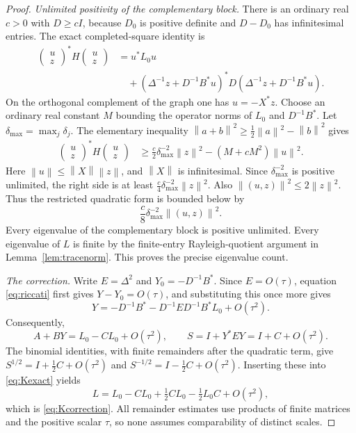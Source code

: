 \documentclass[11pt,oneside]{article}
\numberwithin{equation}{section}
\theoremstyle{plain}
\theoremstyle{definition}
\theoremstyle{remark}
\newcommand{\norm}[1]{\left\|#1\right\|}
\begin{document}
\begin{proof}
\textit{Unlimited positivity of the complementary block.}
There is an ordinary real $c>0$ with $D\ge cI$, because $D_0$ is positive definite and $D-D_0$ has infinitesimal entries. The exact completed-square identity is
\begin{align}\label{eq:completesquare}
 \begin{pmatrix}u\\z\end{pmatrix}^{\!*}
 H\begin{pmatrix}u\\z\end{pmatrix}
 &=u^*L_0u\\
 &\quad+(\Delta^{-1}z+D^{-1}B^*u)^*
 D(\Delta^{-1}z+D^{-1}B^*u).\nonumber
\end{align}
On the orthogonal complement of the graph one has $u=-X^*z$. Choose an ordinary real constant $M$ bounding the operator norms of $L_0$ and $D^{-1}B^*$. Let $\delta_{\max}=\max_j\delta_j$. The elementary inequality
$\norm{a+b}^2\ge\tfrac12\norm a^2-\norm b^2$ gives
\begin{align*}
 \begin{pmatrix}u\\z\end{pmatrix}^{\!*}
 H\begin{pmatrix}u\\z\end{pmatrix}
 &\ge \frac c2\delta_{\max}^{-2}\norm z^2
 -(M+cM^2)\norm u^2.
\end{align*}
Here $\norm u\le\norm X\norm z$, and $\norm X$ is infinitesimal. Since $\delta_{\max}^{-2}$ is positive unlimited, the right side is at least
$\tfrac c4\delta_{\max}^{-2}\norm z^2$. Also
$\norm{(u,z)}^2\le2\norm z^2$. Thus the restricted quadratic form is bounded below by
\[
 \frac c8\delta_{\max}^{-2}\norm{(u,z)}^2.
\]
Every eigenvalue of the complementary block is positive unlimited. Every eigenvalue of $L$ is finite by the finite-entry Rayleigh-quotient argument in Lemma~\ref{lem:tracenorm}. This proves the precise eigenvalue count.

\textit{The correction.}
Write $E=\Delta^2$ and $Y_0=-D^{-1}B^*$. Since $E=O(\tau)$, equation \eqref{eq:riccati} first gives $Y-Y_0=O(\tau)$, and substituting this once more gives
\begin{equation}\label{eq:Yexpansion}
 Y=-D^{-1}B^*-D^{-1}ED^{-1}B^*L_0+O(\tau^2).
\end{equation}
Consequently,
\[
 A+BY=L_0-CL_0+O(\tau^2),\qquad
 S=I+Y^*EY=I+C+O(\tau^2).
\]
The binomial identities, with finite remainders after the quadratic term, give
$S^{1/2}=I+\tfrac12C+O(\tau^2)$ and
$S^{-1/2}=I-\tfrac12C+O(\tau^2)$. Inserting these into \eqref{eq:Kexact} yields
\[
 L=L_0-CL_0+\tfrac12CL_0-\tfrac12L_0C+O(\tau^2),
\]
which is \eqref{eq:Kcorrection}. All remainder estimates use products of finite matrices and the positive scalar $\tau$, so none assumes comparability of distinct scales.
\end{proof}
\end{document}
